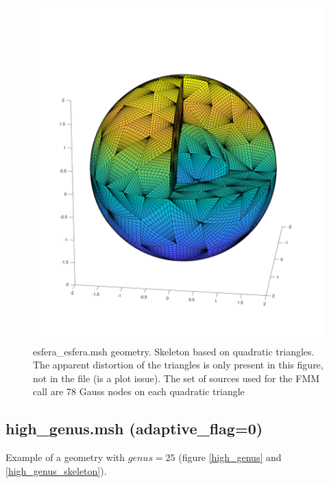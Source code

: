 \documentclass[11pt, oneside]{article}   	%
\begin{document}
\begin{figure}[H]
\begin{center}
\includegraphics[width=6in]{esfera_esfera_skeleton.pdf}
\end{center}
\caption{esfera\_esfera.msh geometry. Skeleton based on quadratic triangles. The apparent distortion of the triangles is only present in this figure, not in the file (is a plot issue). The set of sources used for the FMM call are 78 Gauss nodes on each quadratic triangle}
\label{esfera_esfera_skeleton}
\end{figure}








\newpage
\subsection{high\_genus.msh (adaptive\_flag=0)}
Example of a geometry with $genus=25$ (figure \ref{high_genus} and \ref{high_genus_skeleton}).
\end{document}
